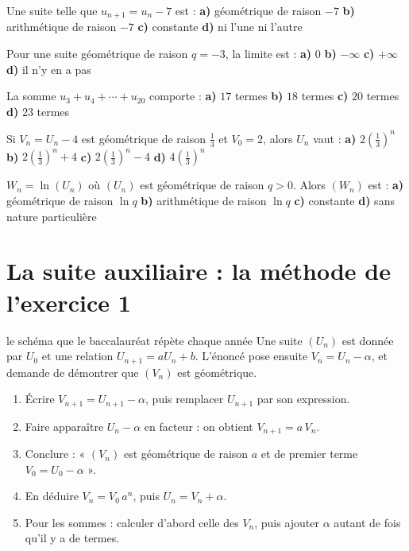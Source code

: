 \begin{qcm}
\exo Une suite telle que $u_{n+1} = u_{n}-7$ est :
\textbf{a)} géométrique de raison $-7$ \quad
\textbf{b)} arithmétique de raison $-7$ \quad
\textbf{c)} constante \quad \textbf{d)} ni l'une ni l'autre 

\exo Pour une suite géométrique de raison $q = -3$, la limite est :
\textbf{a)} $0$ \quad \textbf{b)} $-\infty$ \quad \textbf{c)} $+\infty$
\quad \textbf{d)} il n'y en a pas 

\exo La somme $u_{3}+u_{4}+\cdots+u_{20}$ comporte :
\textbf{a)} $17$ termes \quad \textbf{b)} $18$ termes \quad
\textbf{c)} $20$ termes \quad \textbf{d)} $23$ termes 

\exo Si $V_{n} = U_{n}-4$ est géométrique de raison $\frac13$ et
$V_{0} = 2$, alors $U_{n}$ vaut :
\textbf{a)} $2\left(\frac13\right)^{n}$ \quad
\textbf{b)} $2\left(\frac13\right)^{n}+4$ \quad
\textbf{c)} $2\left(\frac13\right)^{n}-4$ \quad
\textbf{d)} $4\left(\frac13\right)^{n}$ 

\exo $W_{n} = \ln\left(U_{n}\right)$ où $\left(U_{n}\right)$ est géométrique
de raison $q>0$. Alors $\left(W_{n}\right)$ est :
\textbf{a)} géométrique de raison $\ln q$ \quad
\textbf{b)} arithmétique de raison $\ln q$ \quad
\textbf{c)} constante \quad \textbf{d)} sans nature particulière
\end{qcm}

\section{La suite auxiliaire : la méthode de l'exercice 1}

\begin{methode}{le schéma que le baccalauréat répète chaque année}
Une suite $\left(U_{n}\right)$ est donnée par $U_{0}$ et une relation
$U_{n+1} = aU_{n}+b$. L'énoncé pose ensuite $V_{n} = U_{n}-\alpha$, et
demande de démontrer que $\left(V_{n}\right)$ est géométrique.
\begin{enumerate}[label=\textbf{\arabic*.}, leftmargin=*, itemsep=0.15em]
  \item Écrire $V_{n+1} = U_{n+1}-\alpha$, puis remplacer $U_{n+1}$ par son
        expression.
  \item Faire apparaître $U_{n}-\alpha$ en facteur : on obtient
        $V_{n+1} = a\,V_{n}$.
  \item Conclure : « $\left(V_{n}\right)$ est géométrique de raison $a$ et
        de premier terme $V_{0} = U_{0}-\alpha$ ».
  \item En déduire $V_{n} = V_{0}\,a^{n}$, puis
        $U_{n} = V_{n}+\alpha$.
  \item Pour les sommes : calculer d'abord celle des $V_{n}$, puis ajouter
        $\alpha$ autant de fois qu'il y a de termes.
\end{enumerate}
\end{methode}

